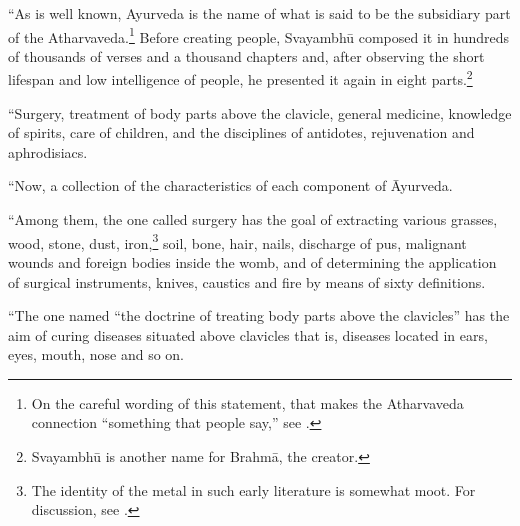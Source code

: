 \begin{translation}
“As is well known, Ayurveda is the name of what is said to be the
subsidiary part of the Atharvaveda.\footnote{On the careful wording
    of this statement, that makes the Atharvaveda connection “something
    that people say,” see \cite[400--401]{wuja-2022}.} Before creating
    people, Svayambhū composed it in hundreds of thousands of verses and
    a thousand chapters and, after observing the short lifespan and low
    intelligence of people, he presented it again in eight
    parts.\footnote{Svayambhū is another name for Brahmā, the creator.}
    
    \item[7] 
    
“Surgery, treatment of body parts above the clavicle, general
medicine, knowledge of spirits, care of children, and the disciplines
of antidotes, rejuvenation and aphrodisiacs. %
    
    \item[8.1] 
    
“Now,  a collection of the characteristics of each component of
Āyurveda.
    
    \item[8.1a] 
    
“Among them, the one called surgery has the goal of extracting
various grasses, wood, stone, dust, iron,\footnote{The identity of
    the metal in such early literature is somewhat moot. For discussion,
    see \cite{wujad-2019}.} soil, bone, hair, nails, discharge of pus,
    malignant wounds and foreign bodies inside the womb, and of
    determining the application of surgical instruments, knives, caustics
    and fire by means of sixty definitions. %
    
    \item[8.2] 
    
“The one named “the doctrine of treating body parts above the
clavicles” has the aim of curing diseases situated above clavicles
that is, diseases located in ears, eyes, mouth, nose and so on.
    

\end{translation}
